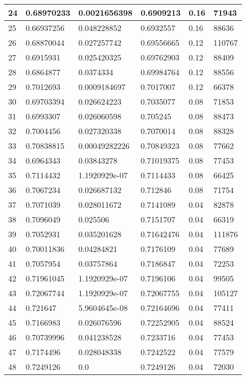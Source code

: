 \begin{longtable}{|l|l|l|l|l|l|}
24 & 0.68970233 & 0.0021656398 & 0.6909213 & 0.16 & 71943 \\ \hline 
25 & 0.66937256 & 0.048228852 & 0.6932557 & 0.16 & 88636 \\ \hline 
26 & 0.68870044 & 0.027257742 & 0.69556665 & 0.12 & 110767 \\ \hline 
27 & 0.6915931 & 0.025420325 & 0.69762903 & 0.12 & 88409 \\ \hline 
28 & 0.6864877 & 0.0374334 & 0.69984764 & 0.12 & 88556 \\ \hline 
29 & 0.7012693 & 0.0009184697 & 0.7017007 & 0.12 & 66378 \\ \hline 
30 & 0.69703394 & 0.026624223 & 0.7035077 & 0.08 & 71853 \\ \hline 
31 & 0.6993307 & 0.026060598 & 0.705245 & 0.08 & 88473 \\ \hline 
32 & 0.7004456 & 0.027320338 & 0.7070014 & 0.08 & 88328 \\ \hline 
33 & 0.70838815 & 0.00049282226 & 0.70849323 & 0.08 & 77662 \\ \hline 
34 & 0.6964343 & 0.03843278 & 0.71019375 & 0.08 & 77453 \\ \hline 
35 & 0.7114432 & 1.1920929e-07 & 0.7114433 & 0.08 & 66425 \\ \hline 
36 & 0.7067234 & 0.026687132 & 0.712846 & 0.08 & 71754 \\ \hline 
37 & 0.7071039 & 0.028011672 & 0.7141089 & 0.04 & 82878 \\ \hline 
38 & 0.7096049 & 0.025506 & 0.7151707 & 0.04 & 66319 \\ \hline 
39 & 0.7052931 & 0.035201628 & 0.71642476 & 0.04 & 111876 \\ \hline 
40 & 0.70011836 & 0.04284821 & 0.7176109 & 0.04 & 77689 \\ \hline 
41 & 0.7057954 & 0.03757864 & 0.7186847 & 0.04 & 72253 \\ \hline 
42 & 0.71961045 & 1.1920929e-07 & 0.7196106 & 0.04 & 99505 \\ \hline 
43 & 0.72067744 & 1.1920929e-07 & 0.72067755 & 0.04 & 105127 \\ \hline 
44 & 0.721647 & 5.9604645e-08 & 0.72164696 & 0.04 & 77411 \\ \hline 
45 & 0.7166983 & 0.026076596 & 0.72252905 & 0.04 & 88524 \\ \hline 
46 & 0.70739996 & 0.041238528 & 0.7233716 & 0.04 & 77453 \\ \hline 
47 & 0.7174496 & 0.028048338 & 0.7242522 & 0.04 & 77579 \\ \hline 
48 & 0.7249126 & 0.0 & 0.7249126 & 0.04 & 72030 \\ \hline 

\end{longtable}
